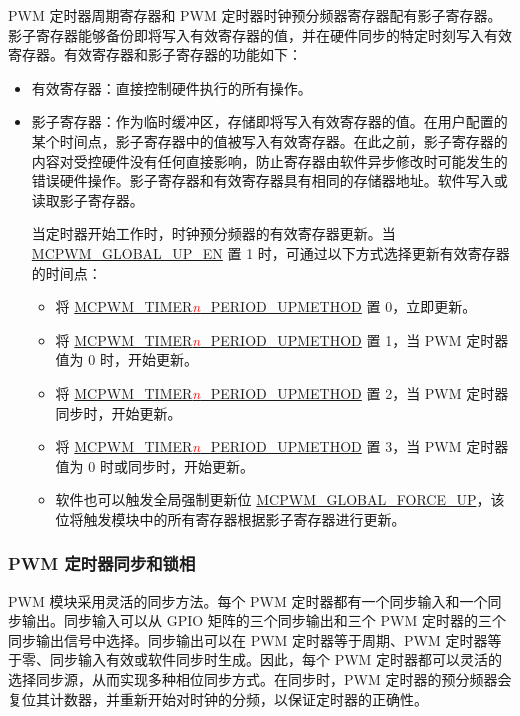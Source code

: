 \documentclass[main\_\_CN.tex]{subfiles}
\begin{document}
PWM 定时器周期寄存器和 PWM 定时器时钟预分频器寄存器配有影子寄存器。影子寄存器能够备份即将写入有效寄存器的值，并在硬件同步的特定时刻写入有效寄存器。有效寄存器和影子寄存器的功能如下：
\begin{itemize}
    \item 有效寄存器：直接控制硬件执行的所有操作。
    \item 影子寄存器：作为临时缓冲区，存储即将写入有效寄存器的值。在用户配置的某个时间点，影子寄存器中的值被写入有效寄存器。在此之前，影子寄存器的内容对受控硬件没有任何直接影响，防止寄存器由软件异步修改时可能发生的错误硬件操作。影子寄存器和有效寄存器具有相同的存储器地址。软件写入或读取影子寄存器。

    当定时器开始工作时，时钟预分频器的有效寄存器更新。当 \hyperref[fielddesc:MCPWMGLOBALUPEN]{MCPWM\_GLOBAL\_UP\_EN} 置 1 时，可通过以下方式选择更新有效寄存器的时间点：
    \begin{itemize}
        \item 将 \hyperref[fielddesc:MCPWMTIMERNPERIODUPMETHOD]{MCPWM\_TIMER\textcolor{red}{\it{n}}\_PERIOD\_UPMETHOD} 置 0，立即更新。
        \item 将 \hyperref[fielddesc:MCPWMTIMERNPERIODUPMETHOD]{MCPWM\_TIMER\textcolor{red}{\it{n}}\_PERIOD\_UPMETHOD} 置 1，当 PWM 定时器值为 0 时，开始更新。
        \item 将 \hyperref[fielddesc:MCPWMTIMERNPERIODUPMETHOD]{MCPWM\_TIMER\textcolor{red}{\it{n}}\_PERIOD\_UPMETHOD} 置 2，当 PWM 定时器同步时，开始更新。
        \item 将 \hyperref[fielddesc:MCPWMTIMERNPERIODUPMETHOD]{MCPWM\_TIMER\textcolor{red}{\it{n}}\_PERIOD\_UPMETHOD} 置 3，当 PWM 定时器值为 0 时或同步时，开始更新。
        \item 软件也可以触发全局强制更新位 \hyperref[fielddesc:MCPWMGLOBALFORCEUP]{MCPWM\_GLOBAL\_FORCE\_UP}，该位将触发模块中的所有寄存器根据影子寄存器进行更新。
    \end{itemize}
\end{itemize}

\subsubsection{PWM 定时器同步和锁相}
PWM 模块采用灵活的同步方法。每个 PWM 定时器都有一个同步输入和一个同步输出。同步输入可以从 GPIO 矩阵的三个同步输出和三个 PWM 定时器的三个同步输出信号中选择。同步输出可以在 PWM 定时器等于周期、PWM 定时器等于零、同步输入有效或软件同步时生成。因此，每个 PWM 定时器都可以灵活的选择同步源，从而实现多种相位同步方式。在同步时，PWM 定时器的预分频器会复位其计数器，并重新开始对时钟的分频，以保证定时器的正确性。
\end{document}
